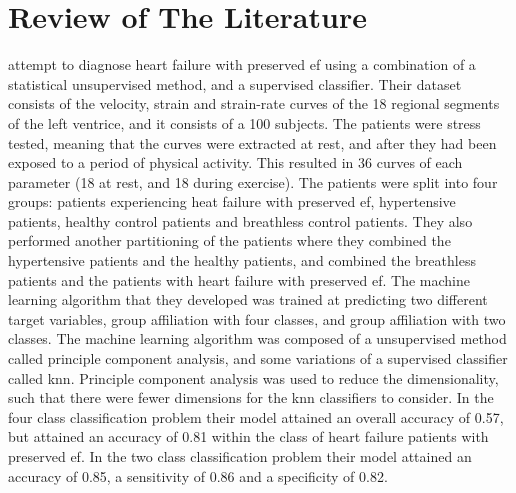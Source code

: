 \chapter{Review of The Literature} \label{chap:lit}

\textcite{hf_diagnosis_ml} attempt to diagnose heart failure with preserved \acrshort{ef} using a combination of a statistical unsupervised method, and a supervised classifier. Their dataset consists of the velocity, strain and strain-rate curves of the 18 regional segments of the left ventrice, and it consists of a 100 subjects. The patients were stress tested, meaning that the curves were extracted at rest, and after they had been exposed to a period of physical activity. This resulted in 36 curves of each parameter (18 at rest, and 18 during exercise). The patients were split into four groups: patients experiencing heat failure with preserved \acrshort{ef}, hypertensive patients, healthy control patients and breathless control patients. They also performed another partitioning of the patients where they combined the hypertensive patients and the healthy patients, and combined the breathless patients and the patients with heart failure with preserved \acrshort{ef}. The machine learning algorithm that they developed was trained at predicting two different target variables, group affiliation with four classes, and group affiliation with two classes. The machine learning algorithm was composed of a unsupervised method called principle component analysis, and some variations of a supervised classifier called \acrfull{knn}. Principle component analysis was used to reduce the dimensionality, such that there were fewer dimensions for the \acrshort{knn} classifiers to consider. In the four class classification problem their model attained an overall accuracy of 0.57, but attained an accuracy of 0.81 within the class of heart failure patients with preserved \acrshort{ef}. In the two class classification problem their model attained an accuracy of 0.85, a sensitivity of 0.86 and a specificity of 0.82. \bigskip


